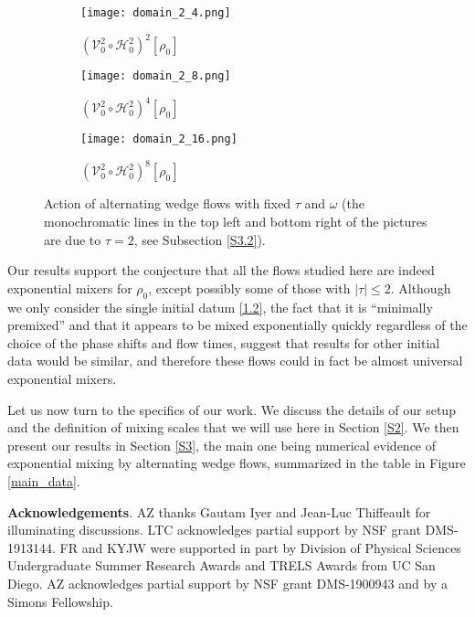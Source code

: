 \documentclass[12pt]{article}
\numberwithin{figure}{section}
\numberwithin{equation}{section}
\newcommand{\calH}{{\mathcal{H}}}
\newcommand{\calV}{{\mathcal{V}}}
\begin{document}
\begin{figure}[htbp]
    \centering
    \begin{subfigure}[t]{0.3\textwidth}
        \centering
        \texttt{[image: domain\_2\_4.png]}
        \caption{$(\calV_{0}^{2} \circ \calH_{0}^{2})^2[\rho_0]$}
    \end{subfigure}
    \hfill
    \begin{subfigure}[t]{0.3\textwidth}
        \centering
        \texttt{[image: domain\_2\_8.png]}      
        \caption{$(\calV_{0}^{2} \circ \calH_{0}^{2})^{4}[\rho_0]$}
    \end{subfigure}
    \hfill
    \begin{subfigure}[t]{0.3\textwidth}
        \centering
        \texttt{[image: domain\_2\_16.png]}
        \caption{$(\calV_{0}^{2} \circ \calH_{0}^{2})^{8}[\rho_0]$}
    \end{subfigure}
    
    \caption{Action of alternating wedge flows with fixed $\tau$ and $\omega$ (the monochromatic  lines in the top left and bottom right of the pictures are due to $\tau=2$, see Subsection \ref{S3.2}).}
    \label{mixing_example}
\end{figure}

Our results support the conjecture that all the flows studied here are indeed exponential mixers for $\rho_0$,
except possibly some of those with $|\tau|\le 2$.  Although we only consider the single initial datum \eqref{1.2}, the fact that it is ``minimally premixed'' and that it appears to be  mixed exponentially quickly regardless of the choice of the phase shifts and flow times, suggest that  results for other initial data would be similar, and therefore these flows could in fact be almost universal exponential mixers.

Let us now turn to the specifics of our work.  We discuss the details of our setup and the definition of mixing scales that we will use here in Section \ref{S2}.  We then present our results in Section \ref{S3}, the main one being numerical evidence of exponential mixing by alternating wedge flows, summarized in the table in Figure \ref{main_data}.
\medskip

{\bf Acknowledgements}.  AZ thanks Gautam Iyer and Jean-Luc Thiffeault for illuminating discussions.   LTC acknowledges partial support by  NSF grant DMS-1913144.  FR and KYJW were supported in part   by Division of Physical Sciences Undergraduate Summer Research Awards and 
TRELS Awards from UC San Diego.
AZ acknowledges partial support by  NSF grant DMS-1900943 and by a Simons Fellowship.
\end{document}
